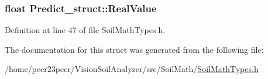 \hypertarget{struct_predict__struct_a09932ff9ac15e4b182bf6e53232eba0f}{}
\subsubsection[{Real\+Value}]{\setlength{\rightskip}{0pt plus 5cm}float Predict\+\_\+struct\+::\+Real\+Value}\label{struct_predict__struct_a09932ff9ac15e4b182bf6e53232eba0f}


Definition at line 47 of file Soil\+Math\+Types.\+h.



The documentation for this struct was generated from the following file\+:\begin{DoxyCompactItemize}
\item 
/home/peer23peer/\+Vision\+Soil\+Analyzer/src/\+Soil\+Math/\hyperlink{_soil_math_types_8h}{Soil\+Math\+Types.\+h}\end{DoxyCompactItemize}
